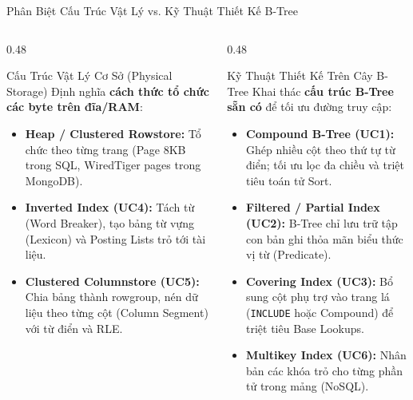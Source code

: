 \documentclass[aspectratio=169,9pt]{beamer}
\begin{document}
\begin{frame}{Phân Biệt Cấu Trúc Vật Lý vs. Kỹ Thuật Thiết Kế B-Tree}
\begin{columns}[T]
\begin{column}{0.48\textwidth}
\begin{block}{Cấu Trúc Vật Lý Cơ Sở (Physical Storage)}
Định nghĩa \textbf{cách thức tổ chức các byte trên đĩa/RAM}:
\begin{itemize}
  \item \textbf{Heap / Clustered Rowstore:} Tổ chức theo từng trang (Page 8KB trong SQL, WiredTiger pages trong MongoDB).
  \item \textbf{Inverted Index (UC4):} Tách từ (Word Breaker), tạo bảng từ vựng (Lexicon) và Posting Lists trỏ tới tài liệu.
  \item \textbf{Clustered Columnstore (UC5):} Chia bảng thành rowgroup, nén dữ liệu theo từng cột (Column Segment) với từ điển và RLE.
\end{itemize}
\end{block}
\end{column}

\begin{column}{0.48\textwidth}
\begin{exampleblock}{Kỹ Thuật Thiết Kế Trên Cây B-Tree}
Khai thác \textbf{cấu trúc B-Tree sẵn có} để tối ưu đường truy cập:
\begin{itemize}
  \item \textbf{Compound B-Tree (UC1):} Ghép nhiều cột theo thứ tự từ điển; tối ưu lọc đa chiều và triệt tiêu toán tử Sort.
  \item \textbf{Filtered / Partial Index (UC2):} B-Tree chỉ lưu trữ tập con bản ghi thỏa mãn biểu thức vị từ (Predicate).
  \item \textbf{Covering Index (UC3):} Bổ sung cột phụ trợ vào trang lá (\texttt{INCLUDE} hoặc Compound) để triệt tiêu Base Lookups.
  \item \textbf{Multikey Index (UC6):} Nhân bản các khóa trỏ cho từng phần tử trong mảng (NoSQL).
\end{itemize}
\end{exampleblock}
\end{column}
\end{columns}
\end{frame}
\end{document}
